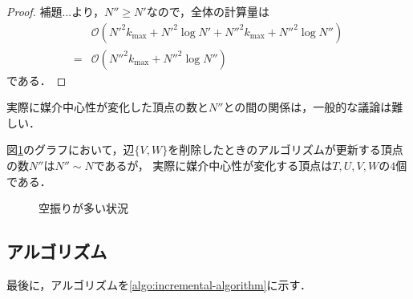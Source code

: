 \begin{proof}
  補題...より，$N''\geq N'$なので，全体の計算量は
  \begin{equation*}
    \begin{aligned}
      &\mathcal{O}(N'^2k_{\max}+N'^2\log N'+N''^2k_{\max}+N''^2\log N'')\\
      =&\mathcal{O}(N''^2k_{\max}+N''^2\log N'')
    \end{aligned}
  \end{equation*}
  である．
\end{proof}

実際に媒介中心性が変化した頂点の数と$N''$との間の関係は，一般的な議論は難しい．

\begin{example}
  図\ref{fig:bc-many-phony}のグラフにおいて，辺$\{V,W\}$を削除したときのアルゴリズムが更新する頂点の数$N''$は$N''\sim N$であるが，
  実際に媒介中心性が変化する頂点は$T,U,V,W$の$4$個である．

  \begin{figure}[tb]
    \centering
    \def\svgwidth{.8\linewidth}
    
    \caption{空振りが多い状況}
    \label{fig:bc-many-phony}
  \end{figure}
\end{example}

\subsection{アルゴリズム}
\label{subsect:incremental-algorithm}
最後に，アルゴリズムを\ref{algo:incremental-algorithm}に示す．

